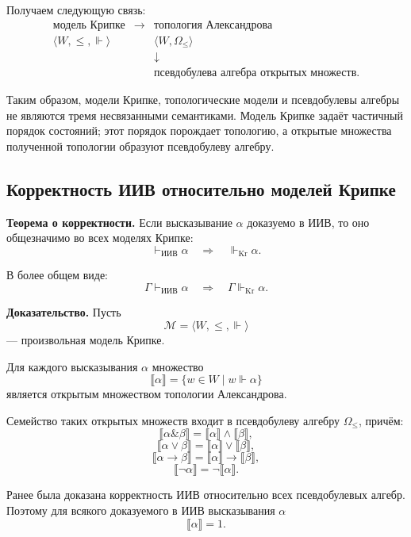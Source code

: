 \documentclass[12pt,a4paper,oneside,openany]{book}
\theoremstyle{definition}
\theoremstyle{plain}
\theoremstyle{remark}
\begin{document}
Получаем следующую связь:
\[
\boxed{
\begin{array}{ccc}
\text{модель Крипке}
&
\longrightarrow
&
\text{топология Александрова}
\\[2mm]
\langle W,\leqslant,\Vdash\rangle
&&
\langle W,\Omega_{\leqslant}\rangle
\\[2mm]
&&
\downarrow
\\[2mm]
&&
\text{псевдобулева алгебра открытых множеств}.
\end{array}
}
\]

Таким образом, модели Крипке, топологические модели и псевдобулевы
алгебры не являются тремя несвязанными семантиками. Модель Крипке
задаёт частичный порядок состояний; этот порядок порождает топологию,
а открытые множества полученной топологии образуют псевдобулеву
алгебру.

\subsection{Корректность ИИВ относительно моделей Крипке}

\textbf{Теорема о корректности.}
Если высказывание \(\alpha\) доказуемо в ИИВ, то оно общезначимо во
всех моделях Крипке:
\[
\vdash_{\mathrm{ИИВ}}\alpha
\quad\Longrightarrow\quad
\Vdash_{\mathrm{Kr}}\alpha.
\]

В более общем виде:
\[
\Gamma\vdash_{\mathrm{ИИВ}}\alpha
\quad\Longrightarrow\quad
\Gamma\Vdash_{\mathrm{Kr}}\alpha.
\]

\textbf{Доказательство.}
Пусть
\[
\mathcal M=\langle W,\leqslant,\Vdash\rangle
\]
--- произвольная модель Крипке.

Для каждого высказывания \(\alpha\) множество
\[
\llbracket\alpha\rrbracket
=
\{w\in W\mid w\Vdash\alpha\}
\]
является открытым множеством топологии Александрова.

Семейство таких открытых множеств входит в псевдобулеву алгебру
\(\Omega_{\leqslant}\), причём:
\[
\llbracket\alpha\mathbin{\&}\beta\rrbracket
=
\llbracket\alpha\rrbracket
\wedge
\llbracket\beta\rrbracket,
\]
\[
\llbracket\alpha\lor\beta\rrbracket
=
\llbracket\alpha\rrbracket
\vee
\llbracket\beta\rrbracket,
\]
\[
\llbracket\alpha\to\beta\rrbracket
=
\llbracket\alpha\rrbracket
\to
\llbracket\beta\rrbracket,
\]
\[
\llbracket\neg\alpha\rrbracket
=
\neg\llbracket\alpha\rrbracket.
\]

Ранее была доказана корректность ИИВ относительно всех
псевдобулевых алгебр. Поэтому для всякого доказуемого в ИИВ
высказывания \(\alpha\)
\[
\llbracket\alpha\rrbracket=1.
\]
\end{document}
